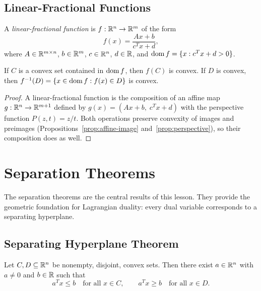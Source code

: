 \documentclass[11pt,a4paper]{article}
\begin{document}
\subsection{Linear-Fractional Functions}

\begin{definition}
\label{def:linear-fractional}
A \emph{linear-fractional function} is $f : \mathbb{R}^n \to \mathbb{R}^m$ of the form
\[
  f(x) = \frac{Ax + b}{c^T x + d},
\]
where $A \in \mathbb{R}^{m \times n}$, $b \in \mathbb{R}^m$, $c \in \mathbb{R}^n$, $d \in \mathbb{R}$, and
$\operatorname{dom} f = \{x : c^T x + d > 0\}$.
\end{definition}

\begin{proposition}
\label{prop:linfrac}
If $C$ is a convex set contained in $\operatorname{dom} f$, then $f(C)$ is convex.
If $D$ is convex, then $f^{-1}(D) = \{x \in \operatorname{dom} f : f(x) \in D\}$ is convex.
\end{proposition}

\begin{proof}
A linear-fractional function is the composition of an affine map
$g : \mathbb{R}^n \to \mathbb{R}^{m+1}$ defined by $g(x) = (Ax + b,\; c^T x + d)$ with the
perspective function $P(z, t) = z/t$.  Both operations preserve convexity of
images and preimages (Propositions~\ref{prop:affine-image}
and~\ref{prop:perspective}), so their composition does as well.
\end{proof}


\section{Separation Theorems}

The separation theorems are the central results of this lesson.  They provide
the geometric foundation for Lagrangian duality: every dual variable
corresponds to a separating hyperplane.

\subsection{Separating Hyperplane Theorem}

\begin{theorem}
\label{thm:separating}
Let $C, D \subseteq \mathbb{R}^n$ be nonempty, disjoint, convex sets.  Then there
exist $a \in \mathbb{R}^n$ with $a \ne 0$ and $b \in \mathbb{R}$ such that
\[
  a^T x \le b \quad \text{for all } x \in C, \qquad
  a^T x \ge b \quad \text{for all } x \in D.
\]
\end{theorem}
\end{document}
